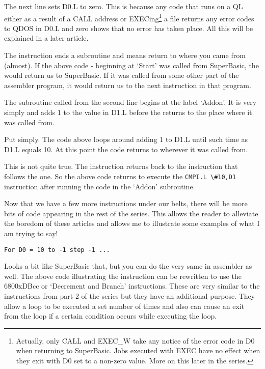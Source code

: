 The next line sets D0.L to zero. This is because any code that runs
    on a QL either as a result of a CALL address or EXECing\footnote{Actually, only CALL and EXEC\_W take any notice of the error code in D0 when returning to SuperBasic. Jobs executed with EXEC have no effect when they exit with D0 set to a non-zero value. More on this later in the series.} a file returns any
    error codes to QDOS in D0.L and zero shows that no error has taken place.
    All this will be explained in a later article.

The  instruction ends a subroutine and means return to where you
    came from (almost). If the above code -{} beginning at `Start' was called
    from SuperBasic, the  would return us to SuperBasic. If it was called
    from some other part of the assembler program, it would return us to the
    next instruction in that program.

The subroutine called from the second line begins at the label
    `Addon'. It is very simply and adds 1 to the value in D1.L before the 
    returns to the place where it was called from.

Put simply. The code above loops around adding 1 to D1.L until such
    time as D1.L equals 10. At this point the code returns to wherever it was
    called from.

This is not quite true. The  instruction returns back to the
    instruction that follows the  one. So the above code returns to execute
    the \lstinline{CMPI.L \#10,D1} instruction after running the code in the `Addon'
    subroutine.

Now that we have a few more instructions under our belts, there will
    be more bits of code appearing in the rest of the series. This allows the
    reader to alleviate the boredom of these articles and allows me to
    illustrate some examples of what I am trying to say!

\begin{lstlisting}[firstnumber=1,]
For D0 = 10 to -1 step -1 ...
\end{lstlisting}

Looks a bit like SuperBasic that, but you can do the very same in
    assembler as well. The above code illustrating the  instruction can be
    rewritten to use the \mc6800x{DBcc} or `Decrement and Branch' instructions. These
    are very similar to the  instructions from part 2 of the series but
    they have an additional purpose. They allow a loop to be executed a set
    number of times and also can cause an exit from the loop if a certain
    condition occurs while executing the loop.

